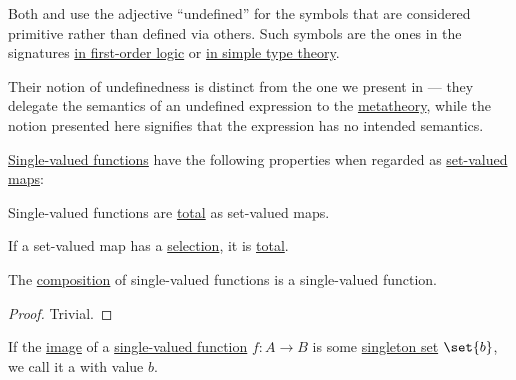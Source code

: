 \begin{remark}\label{rem:undefined_and_primitive_terms}
  Both  and  use the adjective \enquote{undefined} for the symbols that are considered primitive rather than defined via others. Such symbols are the ones in the signatures \hyperref[def:first_order_language/fun]{in first-order logic} or \hyperref[def:simple_type_signature]{in simple type theory}.

  Their notion of undefinedness is distinct from the one we present in  --- they delegate the semantics of an undefined expression to the \hyperref[def:metalogic]{metatheory}, while the notion presented here signifies that the expression has no intended semantics.
\end{remark}

\begin{proposition}\label{thm:def:function}
  \hyperref[def:function]{Single-valued functions} have the following properties when regarded as \hyperref[def:function]{set-valued maps}:
  \begin{thmenum}
     Single-valued functions are \hyperref[def:set_valued_map/partial]{total} as set-valued maps.

     If a set-valued map has a \hyperref[def:function/selection]{selection}, it is \hyperref[def:set_valued_map/partial]{total}.

     The \hyperref[def:set_valued_map/composition]{composition} of single-valued functions is a single-valued function.
  \end{thmenum}
\end{proposition}
\begin{proof}
  Trivial.
\end{proof}

\begin{definition}\label{def:indicator_function}
\end{definition}

\begin{definition}\label{def:constant_function}\mimprovised
  If the \hyperref[def:set_valued_map/image]{image} of a \hyperref[def:function]{single-valued function} \( f: A \to B \) is some \hyperref[def:subsingleton_set]{singleton set} \( \set{ b } \), we call it a  with value \( b \).
\end{definition}


